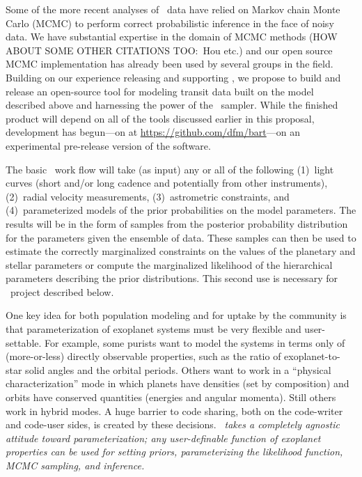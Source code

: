 \documentclass[letterpaper,12pt,preprint]{hack_aastex}
\newcommand{\hurl}[1]{{\scriptsize\url{#1}}}
\newcommand{\Bart}{\package{Bart}}
\newcommand{\emcee}{\package{emcee}}
\newcommand{\TheCreator}{\package{TheCreator}}
\begin{document}
Some of the more recent analyses of \Kepler\ data have relied on Markov chain
Monte Carlo (MCMC) to perform correct probabilistic inference in the face of
noisy data.
We have substantial expertise in the domain of MCMC methods \citep{emcee} (HOW
ABOUT SOME OTHER CITATIONS TOO:\ Hou etc.) and our open source MCMC
implementation has already been used by several groups in the field.
Building on our experience releasing and supporting \emcee, we propose to
build and release an open-source tool for modeling transit data built on the
model described above and harnessing the power of the \emcee\ sampler.
While the finished product will depend on all of the tools discussed earlier
in this proposal, development has begun---on  at
\hurl{https://github.com/dfm/bart}---on an experimental pre-release version of
the software.

The basic \Bart\ work flow will take (as input) any or all of the following
(1)~light curves (short and/or long cadence and potentially from other
instruments),
(2)~radial velocity measurements,
(3)~astrometric constraints, and
(4)~parameterized models of the prior probabilities on the model parameters.
The results will be in the form of samples from the posterior probability
distribution for the parameters given the ensemble of data.
These samples can then be used to estimate the correctly marginalized
constraints on the values of the planetary and stellar parameters or compute
the marginalized likelihood of the hierarchical parameters describing the
prior distributions.
This second use is necessary for \TheCreator\ project described below.

One key idea for both population modeling and for uptake by the
community is that parameterization of exoplanet systems must be very
flexible and user-settable.  For example, some purists want to model
the systems in terms only of (more-or-less) directly observable
properties, such as the ratio of exoplanet-to-star solid angles and
the orbital periods.  Others want to work in a ``physical
characterization'' mode in which planets have densities (set by
composition) and orbits have conserved quantities (energies and
angular momenta).  Still others work in hybrid modes.  A huge barrier
to code sharing, both on the code-writer and code-user sides, is
created by these decisions.  \emph{\Bart\ takes a completely agnostic
attitude toward parameterization; any user-definable function of
exoplanet properties can be used for setting priors, parameterizing
the likelihood function, MCMC sampling, and inference.}
\end{document}

